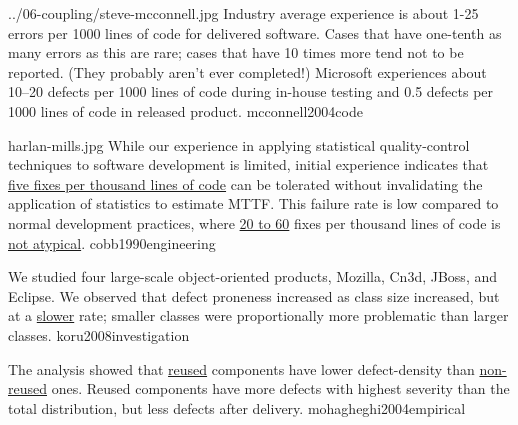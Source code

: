\documentclass{article}
\begin{document}
\qte
  {../06-coupling/steve-mcconnell.jpg}
  {Industry average experience is about 1-25 errors per 1000 lines of code for delivered software. Cases that have one-tenth as many errors as this are rare; cases that have 10 times more tend not to be reported. (They probably aren't ever completed!) Microsoft experiences about 10–20 defects per 1000 lines of code during in-house testing and 0.5 defects per 1000 lines of code in released product.}
  {mcconnell2004code}

\qte
  {harlan-mills.jpg}
  {While our experience in applying statistical quality-control techniques to software development is limited, initial experience indicates that \ul{five fixes per thousand lines of code} can be tolerated without invalidating the application of statistics to estimate MTTF. This failure rate is low compared to normal development practices, where \ul{20 to 60} fixes per thousand lines of code is \ul{not atypical}.}
  {cobb1990engineering}

  {We studied four large-scale object-oriented products, Mozilla, Cn3d, JBoss, and Eclipse. We observed that defect proneness increased as class size increased, but at a \ul{slower} rate; smaller classes were proportionally more problematic than larger classes.}
  {koru2008investigation}

  {The analysis showed that \ul{reused} components have lower defect-density than \ul{non-reused} ones. Reused components have more defects with highest severity than the total distribution, but less defects after delivery.}
  {mohagheghi2004empirical}


\end{document}
